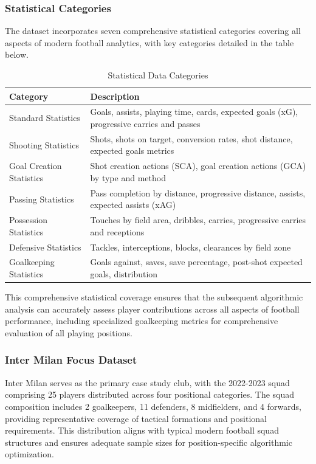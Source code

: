 \subsubsection{Statistical Categories}

The dataset incorporates seven comprehensive statistical categories covering all aspects of modern football analytics, with key categories detailed in the table below.

\begin{table}[h]
\centering
\caption{Statistical Data Categories}
\label{tab:stat_categories}
\begin{tabular}{lp{8cm}}
\toprule
\textbf{Category} & \textbf{Description} \\
\midrule
Standard Statistics & Goals, assists, playing time, cards, expected goals (xG), progressive carries and passes \\
Shooting Statistics & Shots, shots on target, conversion rates, shot distance, expected goals metrics \\
Goal Creation Statistics & Shot creation actions (SCA), goal creation actions (GCA) by type and method \\
Passing Statistics & Pass completion by distance, progressive distance, assists, expected assists (xAG) \\
Possession Statistics & Touches by field area, dribbles, carries, progressive carries and receptions \\
Defensive Statistics & Tackles, interceptions, blocks, clearances by field zone \\
Goalkeeping Statistics & Goals against, saves, save percentage, post-shot expected goals, distribution \\
\bottomrule
\end{tabular}
\end{table}

This comprehensive statistical coverage ensures that the subsequent algorithmic analysis can accurately assess player contributions across all aspects of football performance, including specialized goalkeeping metrics for comprehensive evaluation of all playing positions.

\subsubsection{Inter Milan Focus Dataset}

Inter Milan serves as the primary case study club, with the 2022-2023 squad comprising 25 players distributed across four positional categories. The squad composition includes 2 goalkeepers, 11 defenders, 8 midfielders, and 4 forwards, providing representative coverage of tactical formations and positional requirements. This distribution aligns with typical modern football squad structures and ensures adequate sample sizes for position-specific algorithmic optimization.

